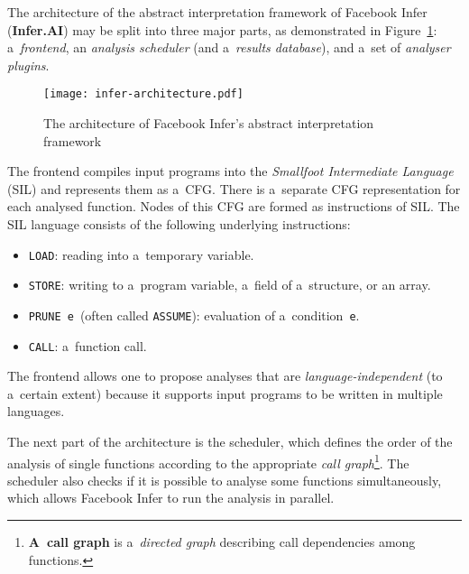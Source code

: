 The architecture of the abstract interpretation framework of Facebook Infer
(\textbf{Infer.AI}) may be split into three major parts, as demonstrated in
Figure~\ref{fig:inferArch}: a~\emph{frontend}, an \emph{analysis scheduler}
(and a~\emph{results database}), and a~set of \emph{analyser plugins}.

\begin{figure}[hbt]
    \centering
    \texttt{[image: infer-architecture.pdf]}
    \caption{%
        The architecture of Facebook Infer's abstract interpretation
        framework~\cite{harmimBP, projectPracticeMarcin2018}
    }
    \label{fig:inferArch}
\end{figure}

The frontend compiles input programs into the \emph{Smallfoot Intermediate
Language} (SIL) and represents them as a~CFG. There is a~separate CFG
representation for each analysed function. Nodes of this CFG are formed as
instructions of SIL. The SIL language consists of the following underlying
instructions:
\begin{itemize}
    \item
        \texttt{LOAD}: reading into a~temporary variable.

    \item
        \texttt{STORE}: writing to a~program variable, a~field of
        a~structure, or an array.

    \item
        \texttt{PRUNE~e}~(often called \texttt{ASSUME}): evaluation of
        a~condition~\texttt{e}.

    \item
        \texttt{CALL}: a~function call.
\end{itemize}
The frontend allows one to propose analyses that are \emph{language-independent}
(to a~certain extent) because it supports input programs to be written in
multiple languages.

The next part of the architecture is the scheduler, which defines the order of
the analysis of single functions according to the appropriate \emph{call
graph}\footnote{\textbf{A~call graph} is a~\emph{directed graph} describing
call dependencies among functions.}. The scheduler also checks if it is possible
to analyse some functions simultaneously, which allows Facebook Infer to run
the analysis in parallel.

